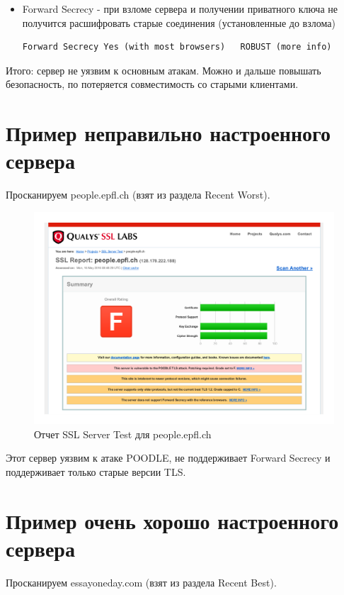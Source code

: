 \begin{itemize}
	\item Forward Secrecy - при взломе сервера и получении приватного ключа не получится расшифровать старые соединения (установленные до взлома)
	\begin{lstlisting}
Forward Secrecy	Yes (with most browsers)   ROBUST (more info)
	\end{lstlisting}
\end{itemize}

Итого: сервер не уязвим к основным атакам. Можно и дальше повышать безопасность, по потеряется совместимость со старыми клиентами.

\section{Пример неправильно настроенного сервера}

Просканируем people.epfl.ch (взят из раздела Recent Worst).

\begin{figure}[H]
	\centering
	\includegraphics[width=\textwidth]{images/2.png}
	\caption{Отчет SSL Server Test для people.epfl.ch}
\end{figure}

Этот сервер уязвим к атаке POODLE, не поддерживает Forward Secrecy и поддерживает только старые версии TLS.

\section{Пример очень хорошо настроенного сервера}

Просканируем essayoneday.com (взят из раздела Recent Best).


